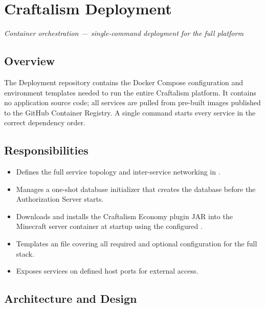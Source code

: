 

\chapter{Craftalism Deployment}
\label{ch:deployment}


\textcolor{CraftGray}{\textit{Container orchestration — single-command deployment for the full platform}}

\bigskip

\section{Overview}

The Deployment repository contains the Docker Compose configuration and environment templates needed to run the entire Craftalism platform. It contains no application source code; all services are pulled from pre-built images published to the GitHub Container Registry. A single  command starts every service in the correct dependency order.

\section{Responsibilities}

\begin{itemize}
  \item Defines the full service topology and inter-service networking in .
  \item Manages a one-shot database initializer that creates the  database before the Authorization Server starts.
  \item Downloads and installs the Craftalism Economy plugin JAR into the Minecraft server container at startup using the configured .
  \item Templates an  file covering all required and optional configuration for the full stack.
  \item Exposes services on defined host ports for external access.
\end{itemize}

\section{Architecture and Design}

